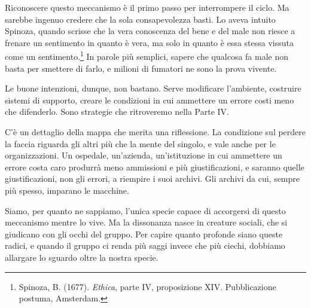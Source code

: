 Riconoscere questo meccanismo è il primo passo per interrompere il ciclo. Ma sarebbe ingenuo credere che la sola consapevolezza basti. Lo aveva intuito Spinoza, quando scrisse che la vera conoscenza del bene e del male non riesce a frenare un sentimento in quanto è vera, ma solo in quanto è essa stessa vissuta come un sentimento.\footnote{Spinoza, B. (1677). \textit{Ethica}, parte IV, proposizione XIV. Pubblicazione postuma, Amsterdam.} In parole più semplici, sapere che qualcosa fa male non basta per smettere di farlo, e milioni di fumatori ne sono la prova vivente.

Le buone intenzioni, dunque, non bastano. Serve modificare l'ambiente, costruire sistemi di supporto, creare le condizioni in cui ammettere un errore costi meno che difenderlo. Sono strategie che ritroveremo nella Parte IV.

C'è un dettaglio della mappa che merita una riflessione. La condizione sul perdere la faccia riguarda gli altri più che la mente del singolo, e vale anche per le organizzazioni. Un ospedale, un'azienda, un'istituzione in cui ammettere un errore costa caro produrrà meno ammissioni e più giustificazioni, e saranno quelle giustificazioni, non gli errori, a riempire i suoi archivi. Gli archivi da cui, sempre più spesso, imparano le macchine.

Siamo, per quanto ne sappiamo, l'unica specie capace di accorgersi di questo meccanismo mentre lo vive. Ma la dissonanza nasce in creature sociali, che si giudicano con gli occhi del gruppo. Per capire quanto profonde siano queste radici, e quando il gruppo ci renda più saggi invece che più ciechi, dobbiamo allargare lo sguardo oltre la nostra specie.
